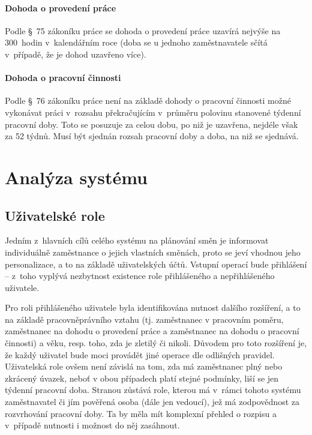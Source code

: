 \documentclass[twoside]{ctuthesis}
\begin{document}
\subsubsection{Dohoda o provedení práce}
Podle §~75 zákoníku práce se dohoda o provedení práce uzavírá nejvýše na 300~hodin v~kalendářním roce (doba se u jednoho zaměstnavatele sčítá v~případě, že je dohod uzavřeno více).

\subsubsection{Dohoda o pracovní činnosti}
Podle §~76 zákoníku práce není na základě dohody o pracovní činnosti možné vykonávat práci v~rozsahu překračujícím v~průměru polovinu stanovené týdenní pracovní doby. Toto se posuzuje za celou dobu, po niž je uzavřena, nejdéle však za 52 týdnů. Musí být sjednán rozsah pracovní doby a doba, na niž se sjednává.



\chapter{Analýza systému}

%
%


\section{Uživatelské role}
Jedním z~hlavních cílů celého systému na plánování směn je informovat individuálně zaměstnance o jejich vlastních směnách, proto se jeví vhodnou jeho personalizace, a to na základě uživatelských účtů. Vstupní operací bude přihlášení -- z~toho vyplývá nezbytnost existence role přihlášeného a nepřihlášeného uživatele.

Pro roli přihlášeného uživatele byla identifikována nutnost dalšího rozšíření, a to na základě pracovněprávního vztahu (tj. zaměstnanec v pracovním poměru, zaměstnanec na dohodu o provedení práce a zaměstnanec na dohodu o pracovní činnosti) a věku, resp. toho, zda je zletilý či nikoli. Důvodem pro toto rozšíření je, že každý uživatel bude moci provádět jiné operace dle odlišných pravidel. Uživatelská role ovšem není závislá na tom, zda má zaměstnanec plný nebo zkrácený úvazek, neboť v obou případech platí stejné podmínky, liší se jen týdenní pracovní doba. Stranou zůstává role, kterou má v~rámci tohoto systému zaměstnavatel či jím pověřená osoba (dále jen vedoucí), jež má zodpovědnost za rozvrhování pracovní doby. Ta by měla mít komplexní přehled o rozpisu a v~případě nutnosti i možnost do něj zasáhnout.
\end{document}
